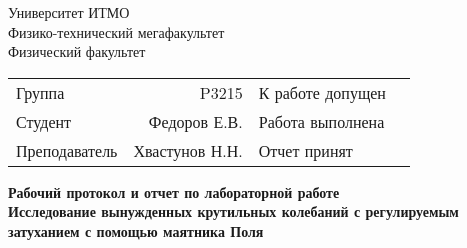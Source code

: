 \begin{titlepage}
\thispagestyle{firststyle}
\begin{center}
    Университет ИТМО \\
    Физико-технический мегафакультет \\
    Физический факультет \\
\end{center}
\vspace{1cm}
\begin{center}
    \begin{tabular}{ l r l c }
        Группа & P3215 & К работе допущен & \hspace{2cm}  \\\cline{4-4}
        Студент & Федоров Е.В. & Работа выполнена & \hspace{2cm} \\\cline{4-4}
        Преподаватель & Хвастунов Н.Н. & Отчет принят & \hspace{2cm} \\\cline{4-4}
    \end{tabular}
\end{center}

\vspace{2cm}

\begin{center}
    \Large
    \textbf{Рабочий протокол и отчет по
        лабораторной работе 
    }
    \\
    \huge
    \textbf{Исследование вынужденных
крутильных колебаний с регулируемым
затуханием с помощью маятника Поля}
\end{center}
\end{titlepage}
